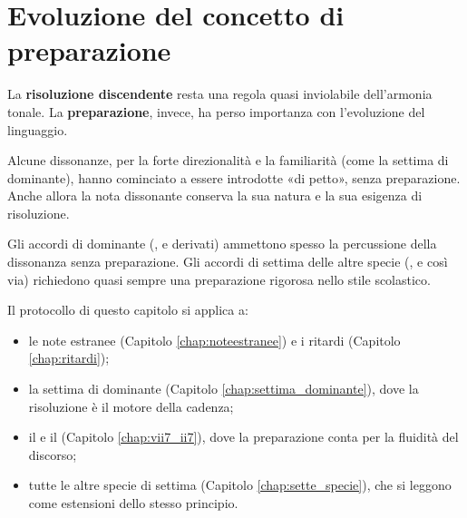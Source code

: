 \section{Evoluzione del concetto di preparazione}
\label{sec:evoluzione_preparazione}

La \textbf{risoluzione discendente} resta una regola quasi inviolabile dell'armonia tonale. La \textbf{preparazione}, invece, ha perso importanza con l'evoluzione del linguaggio.

Alcune dissonanze, per la forte direzionalità e la familiarità (come la settima di dominante), hanno cominciato a essere introdotte «di petto», senza preparazione. Anche allora la nota dissonante conserva la sua natura e la sua esigenza di risoluzione.

\begin{regola}
	\label{reg:dissonanze_non_preparate}
	Gli accordi di dominante (,  e derivati) ammettono spesso la percussione della dissonanza senza preparazione. Gli accordi di settima delle altre specie (,  e così via) richiedono quasi sempre una preparazione rigorosa nello stile scolastico.
\end{regola}

Il protocollo di questo capitolo si applica a:
\begin{itemize}
	\item le note estranee (Capitolo \ref{chap:noteestranee}) e i ritardi (Capitolo \ref{chap:ritardi});
	\item la settima di dominante (Capitolo \ref{chap:settima_dominante}), dove la risoluzione è il motore della cadenza;
	\item il  e il  (Capitolo \ref{chap:vii7_ii7}), dove la preparazione conta per la fluidità del discorso;
	\item tutte le altre specie di settima (Capitolo \ref{chap:sette_specie}), che si leggono come estensioni dello stesso principio.
\end{itemize}
